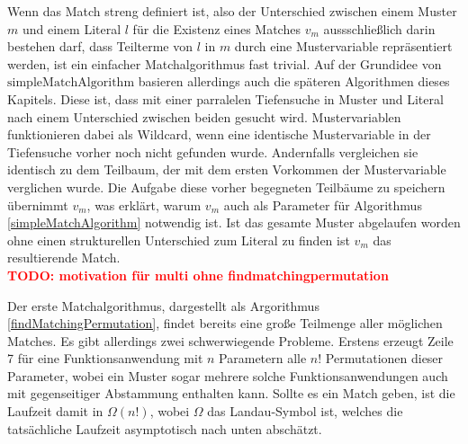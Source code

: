 \documentclass{scrartcl}
\numberwithin{figure}{section} %
\theoremstyle{definition} %
\newcommand{\BFred}[1]{\textbf{\textcolor{red}{#1}}}
\begin{document}
Wenn das Match streng definiert ist, also der Unterschied zwischen einem Muster $m$ und einem Literal $l$ für die Existenz eines Matches $v_m$ aussschließlich darin bestehen darf, dass Teilterme von $l$ in $m$ durch eine Mustervariable repräsentiert werden, ist ein einfacher Matchalgorithmus fast trivial. Auf der Grundidee von $\mathrm{simpleMatchAlgorithm}$ basieren allerdings auch die späteren Algorithmen dieses Kapitels. Diese ist, dass mit einer parralelen Tiefensuche in Muster und Literal nach einem Unterschied zwischen beiden gesucht wird. Mustervariablen funktionieren dabei als Wildcard, wenn eine identische Mustervariable in der Tiefensuche vorher noch nicht gefunden wurde. Andernfalls vergleichen sie identisch zu dem Teilbaum, der mit dem ersten Vorkommen der Mustervariable verglichen wurde. Die Aufgabe diese vorher begegneten Teilbäume zu speichern übernimmt $v_m$, was erklärt, warum $v_m$ auch als Parameter für Algorithmus \ref{simpleMatchAlgorithm} notwendig ist. Ist das gesamte Muster abgelaufen worden ohne einen strukturellen Unterschied zum Literal zu finden ist $v_m$ das resultierende Match.\\

\BFred{TODO: motivation für multi ohne findmatchingpermutation}

Der erste Matchalgorithmus, dargestellt als Argorithmus \ref{findMatchingPermutation}, findet bereits eine große Teilmenge aller möglichen Matches. Es gibt allerdings zwei schwerwiegende Probleme. Erstens erzeugt Zeile 7 für eine Funktionsanwendung mit $n$ Parametern alle $n!$ Permutationen dieser Parameter, wobei ein Muster sogar mehrere solche Funktionsanwendungen auch mit gegenseitiger Abstammung enthalten kann. Sollte es ein Match geben, ist die Laufzeit damit in $\Omega(n!)$, wobei  $\Omega$ das Landau-Symbol ist, welches die tatsächliche Laufzeit asymptotisch nach unten abschätzt.
\end{document}

